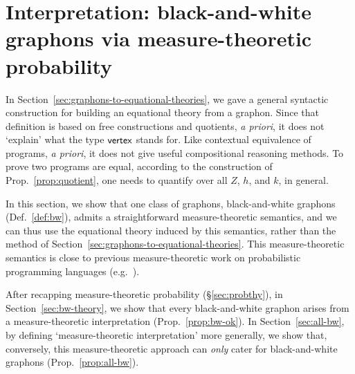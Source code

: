 
\section{Interpretation: black-and-white graphons via measure-theoretic probability}
\label{sec:randomfree}
In Section~\ref{sec:graphons-to-equational-theories}, we gave a general
syntactic construction for building an equational theory from a
graphon. Since that definition is based on free constructions and quotients, \emph{a priori}, it does not `explain' what the type $\mathsf{vertex}$ stands for. Like contextual equivalence of programs, \emph{a priori}, it does not give useful compositional reasoning methods. To prove two programs are equal, according to the construction of Prop.~\ref{prop:quotient}, one needs to quantify over all $Z$, $h$, and $k$, in general.

In this section, we show that one class of graphons, black-and-white
graphons (Def.~\ref{def:bw}), admits a straightforward measure-theoretic semantics, and we can thus 
use the equational theory induced by this semantics, rather than the 
method of Section~\ref{sec:graphons-to-equational-theories}. This measure-theoretic semantics is close to 
previous measure-theoretic work on probabilistic programming
languages (e.g.~\cite{Kozen81,s-finite}). 

After recapping measure-theoretic probability (\S\ref{sec:probthy}), in Section~\ref{sec:bw-theory}, we show that every
black-and-white graphon arises from a measure-theoretic
interpretation (Prop.~\ref{prop:bw-ok}). In Section~\ref{sec:all-bw}, by defining `measure-theoretic interpretation' more
generally, we show that, conversely, this measure-theoretic approach can \emph{only} cater
for black-and-white graphons (Prop.~\ref{prop:all-bw}).


